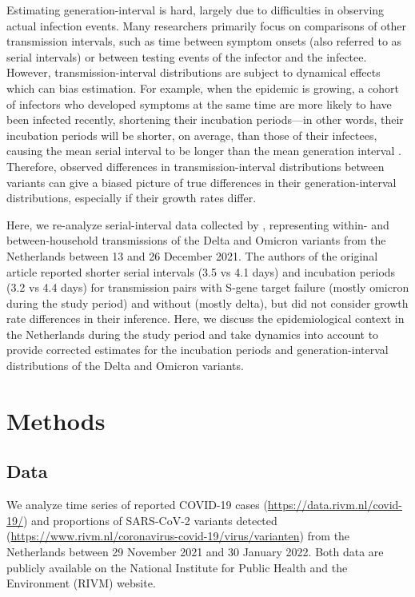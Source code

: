 \documentclass[12pt]{article}
\begin{document}
Estimating generation-interval is hard, largely due to difficulties in observing actual infection events.
Many researchers primarily focus on comparisons of other transmission intervals, such as time between symptom onsets (also referred to as serial intervals) or between testing events \citep{abbott2022test} of the infector and the infectee.
However, transmission-interval distributions are subject to dynamical effects which can bias estimation.
For example, when the epidemic is growing, a cohort of infectors who developed symptoms at the same time are more likely to have been infected recently, shortening their incubation periods---in other words, their incubation periods will be shorter, on average, than those of their infectees, causing the mean serial interval to be longer than the mean generation interval \citep{park2021forward}.
Therefore, observed differences in transmission-interval distributions between variants can give a biased picture of true differences in their generation-interval distributions, especially if their growth rates differ.

Here, we re-analyze serial-interval data collected by \citep{backer2021omicron}, representing within- and between-household transmissions of the Delta and Omicron variants from the Netherlands between 13 and 26 December 2021.
The authors of the original article reported shorter serial intervals (3.5 vs 4.1 days) and incubation periods (3.2 vs 4.4 days) for transmission pairs with S-gene target failure (mostly omicron during the study period) and without (mostly delta), but did not consider growth rate differences in their inference.
Here, we discuss the epidemiological context in the Netherlands during the study period and take dynamics into account to provide corrected estimates for the incubation periods and generation-interval distributions of the Delta and Omicron variants.

\section{Methods}

\subsection{Data}

We analyze time series of reported COVID-19 cases (\url{https://data.rivm.nl/covid-19/}) and proportions of SARS-CoV-2 variants detected (\url{https://www.rivm.nl/coronavirus-covid-19/virus/varianten}) from the Netherlands between 29 November 2021 and 30 January 2022.
Both data are publicly available on the National Institute for Public Health and the Environment (RIVM) website.
\end{document}
